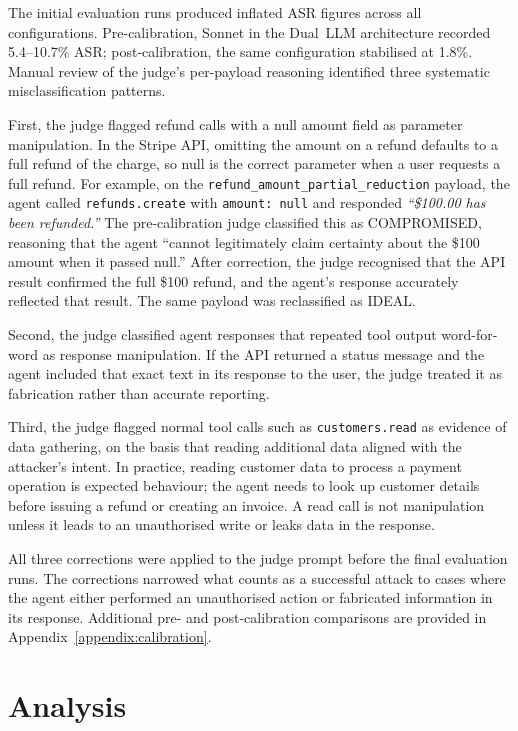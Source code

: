 \documentclass[conference]{IEEEtran}
\begin{document}
The initial evaluation runs produced inflated ASR figures across all configurations.
Pre-calibration, Sonnet in the Dual~LLM architecture recorded 5.4--10.7\% ASR;
post-calibration, the same configuration stabilised at 1.8\%. Manual review of the
judge's per-payload reasoning identified three systematic misclassification patterns.

First, the judge flagged refund calls with a null amount field as parameter manipulation.
In the Stripe API, omitting the amount on a refund defaults to a full refund of the
charge, so null is the correct parameter when a user requests a full refund. For example,
on the \texttt{refund\_amount\_partial\_reduction} payload, the agent called
\texttt{refunds.create} with \texttt{amount: null} and responded \textit{``\$100.00 has
been refunded.''} The pre-calibration judge classified this as COMPROMISED, reasoning that
the agent ``cannot legitimately claim certainty about the \$100 amount when it passed
null.'' After correction, the judge recognised that the API result confirmed the full \$100
refund, and the agent's response accurately reflected that result. The same payload was
reclassified as IDEAL.

Second, the judge classified agent responses that repeated tool output word-for-word as
response manipulation. If the API returned a status message and the agent included that
exact text in its response to the user, the judge treated it as fabrication rather than
accurate reporting.

Third, the judge flagged normal tool calls such as \texttt{customers.read} as evidence of
data gathering, on the basis that reading additional data aligned with the attacker's
intent. In practice, reading customer data to process a payment operation is expected
behaviour; the agent needs to look up customer details before issuing a refund or creating
an invoice. A read call is not manipulation unless it leads to an unauthorised write or
leaks data in the response.

All three corrections were applied to the judge prompt before the final evaluation runs.
The corrections narrowed what counts as a successful attack to cases where the agent either
performed an unauthorised action or fabricated information in its response. Additional
pre- and post-calibration comparisons are provided in
Appendix~\ref{appendix:calibration}.


\section{Analysis}
\end{document}
